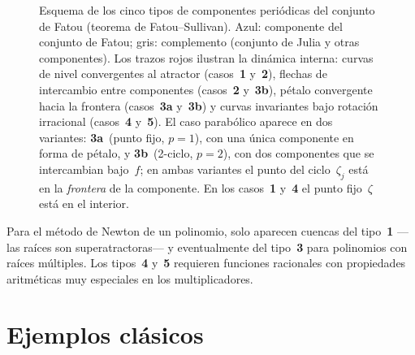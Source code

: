 \documentclass[11pt,a4paper]{article}
\theoremstyle{plain}
\theoremstyle{definition}
\theoremstyle{remark}
\begin{document}
\begin{figure}[htbp]
\caption{Esquema de los cinco tipos de componentes peri\'odicas del conjunto de Fatou
(teorema de Fatou--Sullivan).
Azul: componente del conjunto de Fatou; gris: complemento
(conjunto de Julia y otras componentes).
Los trazos rojos ilustran la din\'amica interna:
curvas de nivel convergentes al atractor (casos~\textbf{1} y~\textbf{2}),
flechas de intercambio entre componentes (casos~\textbf{2} y~\textbf{3b}),
p\'etalo convergente hacia la frontera (casos~\textbf{3a} y~\textbf{3b}) y
curvas invariantes bajo rotaci\'on irracional (casos~\textbf{4} y~\textbf{5}).
El caso parab\'olico aparece en dos variantes:
\textbf{3a}~(punto fijo, $p=1$), con una \'unica componente en forma de p\'etalo, y
\textbf{3b}~(2-ciclo, $p=2$), con dos componentes que se intercambian bajo~$f$;
en ambas variantes el punto del ciclo~$\zeta_j$ est\'a en la
\emph{frontera} de la componente.
En los casos~\textbf{1} y~\textbf{4} el punto fijo~$\zeta$ est\'a en el interior.}
\label{fig:fatou-tipos}
\end{figure}


Para el método de Newton de un polinomio, solo aparecen cuencas del
tipo~\textbf{1} —las raíces son superatractoras— y eventualmente del tipo~\textbf{3}
para polinomios con raíces múltiples.
Los tipos~\textbf{4} y~\textbf{5} requieren funciones racionales con propiedades
aritméticas muy especiales en los multiplicadores.

\section{Ejemplos clásicos}
\label{sec:ejemplos}
\end{document}
